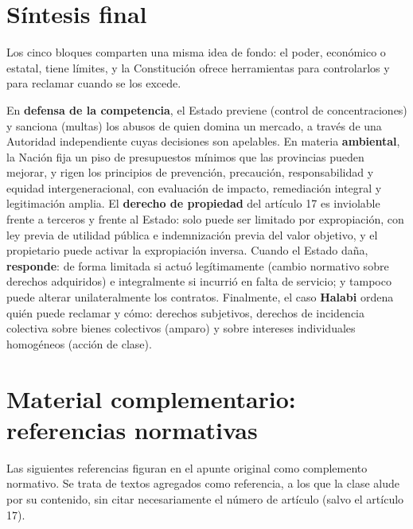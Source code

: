 \documentclass[12pt,oneside]{book}
\begin{document}
\chapter*{Síntesis final}

Los cinco bloques comparten una misma idea de fondo: el poder, económico o estatal, tiene límites, y la Constitución ofrece herramientas para controlarlos y para reclamar cuando se los excede.

En \textbf{defensa de la competencia}, el Estado previene (control de concentraciones) y sanciona (multas) los abusos de quien domina un mercado, a través de una Autoridad independiente cuyas decisiones son apelables. En materia \textbf{ambiental}, la Nación fija un piso de presupuestos mínimos que las provincias pueden mejorar, y rigen los principios de prevención, precaución, responsabilidad y equidad intergeneracional, con evaluación de impacto, remediación integral y legitimación amplia. El \textbf{derecho de propiedad} del artículo 17 es inviolable frente a terceros y frente al Estado: solo puede ser limitado por expropiación, con ley previa de utilidad pública e indemnización previa del valor objetivo, y el propietario puede activar la expropiación inversa. Cuando el Estado daña, \textbf{responde}: de forma limitada si actuó legítimamente (cambio normativo sobre derechos adquiridos) e integralmente si incurrió en falta de servicio; y tampoco puede alterar unilateralmente los contratos. Finalmente, el caso \textbf{Halabi} ordena quién puede reclamar y cómo: derechos subjetivos, derechos de incidencia colectiva sobre bienes colectivos (amparo) y sobre intereses individuales homogéneos (acción de clase).

\chapter{Material complementario: referencias normativas}

Las siguientes referencias figuran en el apunte original como complemento normativo. Se trata de textos agregados como referencia, a los que la clase alude por su contenido, sin citar necesariamente el número de artículo (salvo el artículo 17).
\end{document}
